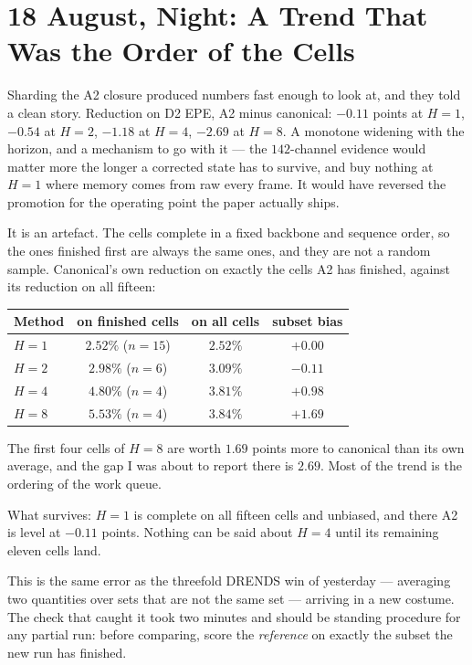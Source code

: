 \documentclass[11pt,a4paper]{article}
\begin{document}
\section*{18 August, Night: A Trend That Was the Order of the Cells}

Sharding the A2 closure produced numbers fast enough to look at, and they told a
clean story. Reduction on D2 EPE, A2 minus canonical: $-0.11$ points at $H{=}1$,
$-0.54$ at $H{=}2$, $-1.18$ at $H{=}4$, $-2.69$ at $H{=}8$. A monotone widening
with the horizon, and a mechanism to go with it --- the $142$-channel evidence
would matter more the longer a corrected state has to survive, and buy nothing at
$H{=}1$ where memory comes from raw every frame. It would have reversed the
promotion for the operating point the paper actually ships.

It is an artefact. The cells complete in a fixed backbone and sequence order, so
the ones finished first are always the same ones, and they are not a random
sample. Canonical's own reduction on exactly the cells A2 has finished, against
its reduction on all fifteen:

\begin{center}
\begin{tabular}{lccc}
\toprule
Method & on finished cells & on all cells & subset bias \\
\midrule
$H{=}1$ & $2.52\%$ ($n{=}15$) & $2.52\%$ & $+0.00$ \\
$H{=}2$ & $2.98\%$ ($n{=}6$)  & $3.09\%$ & $-0.11$ \\
$H{=}4$ & $4.80\%$ ($n{=}4$)  & $3.81\%$ & $+0.98$ \\
$H{=}8$ & $5.53\%$ ($n{=}4$)  & $3.84\%$ & $+1.69$ \\
\bottomrule
\end{tabular}
\end{center}

The first four cells of $H{=}8$ are worth $1.69$ points more to canonical than its
own average, and the gap I was about to report there is $2.69$. Most of the trend
is the ordering of the work queue.

What survives: $H{=}1$ is complete on all fifteen cells and unbiased, and there
A2 is level at $-0.11$ points. Nothing can be said about $H{=}4$ until its
remaining eleven cells land.

This is the same error as the threefold DRENDS win of yesterday --- averaging two
quantities over sets that are not the same set --- arriving in a new costume. The
check that caught it took two minutes and should be standing procedure for any
partial run: before comparing, score the \emph{reference} on exactly the subset
the new run has finished.
\end{document}
